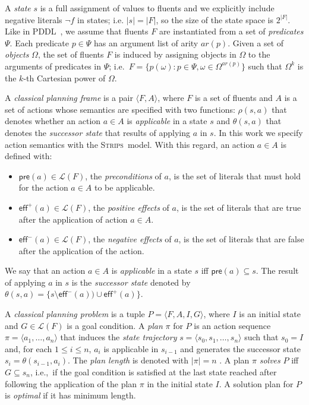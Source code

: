 \documentclass[letterpaper]{article} %
\newcommand{\tup}[1]{{\langle #1 \rangle}}
\newcommand{\pre}{\mathsf{pre}}     %
\newcommand{\eff}{\mathsf{eff}}     %
\newcommand{\strips}{\textsc{Strips}}     %
\begin{document}
A {\em state} $s$ is a full assignment of values to fluents and we explicitly include negative literals $\neg f$ in states; i.e. $|s|=|F|$, so the size of the state space is $2^{|F|}$. Like in PDDL~\cite{fox2003pddl2}, we assume that fluents $F$ are instantiated from a set of {\em predicates} $\Psi$. Each predicate $p\in\Psi$ has an argument list of arity $ar(p)$. Given a set of {\em objects} $\Omega$, the set of fluents $F$ is induced by assigning objects in $\Omega$ to the arguments of predicates in $\Psi$; i.e.~$F=\{p(\omega):p\in\Psi,\omega\in\Omega^{ar(p)}\}$ such that $\Omega^k$ is the $k$-th Cartesian power of $\Omega$.

A {\em classical planning frame} is a pair $\tup{F,A}$, where $F$ is a set of fluents and $A$ is a set of actions whose semantics are specified with two functions: $\rho(s,a)$ that denotes whether an action $a\in A$ is {\em applicable} in a state $s$ and $\theta(s,a)$ that denotes the {\em successor state} that results of applying $a$ in $s$. In this work we specify action semantics with the \strips\ model. With this regard, an action $a\in A$ is defined with:
\begin{itemize}
\item $\pre(a)\in\mathcal{L}(F)$, the {\em preconditions} of $a$, is the set of literals that must hold for the action $a\in A$ to be applicable.
\item $\eff^+(a)\in\mathcal{L}(F)$, the {\em positive effects} of $a$, is the set of literals that are true after the application of action $a\in A$.
\item $\eff^-(a)\in\mathcal{L}(F)$, the {\em negative effects} of $a$, is the set of literals that are false after the application of the action.
\end{itemize}
We say that an action $a\in A$ is {\em applicable} in a state $s$ iff $\pre(a)\subseteq s$. The result of applying $a$ in $s$ is the {\em successor state} denoted by $\theta(s,a)=\{s\setminus\eff^-(a))\cup\eff^+(a)\}$.

A {\em classical planning problem} is a tuple $P=\tup{F,A,I,G}$, where $I$ is an initial state and $G\in\mathcal{L}(F)$ is a goal condition. A {\em plan} $\pi$ for $P$ is an action sequence $\pi=\tup{a_1, \ldots, a_n}$ that induces the {\em state trajectory} $s=\tup{s_0, s_1, \ldots, s_n}$ such that $s_0=I$ and, for each {\small $1\leq i\leq n$}, $a_i$ is applicable in $s_{i-1}$ and generates the successor state $s_i=\theta(s_{i-1},a_i)$. The {\em plan length} is denoted with $|\pi|=n$ . A plan $\pi$ {\em solves} $P$ iff $G\subseteq s_n$, i.e.,~if the goal condition is satisfied at the last state reached after following the application of the plan $\pi$ in the initial state $I$. A solution plan for $P$ is {\em optimal} if it has minimum length.
\end{document}
